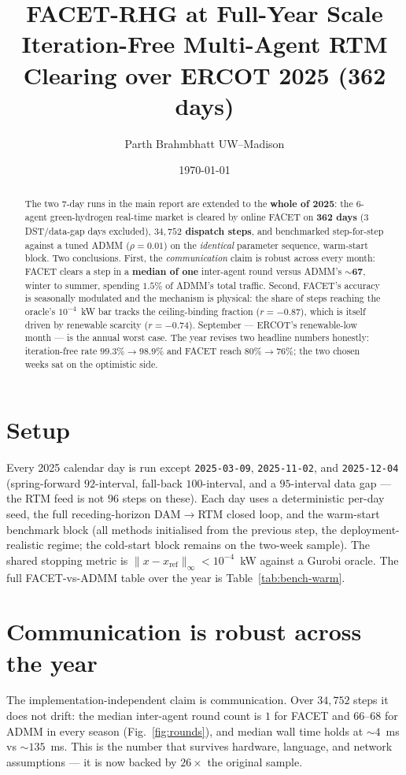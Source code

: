 \documentclass[11pt]{article}
\title{\textbf{FACET-RHG at Full-Year Scale}\\[2pt]
\large Iteration-Free Multi-Agent RTM Clearing over ERCOT 2025 (362 days)}
\author{Parth Brahmbhatt \quad\textbullet\quad UW--Madison}
\date{\today}
\begin{document}
\maketitle

\begin{abstract}
\noindent
The two 7-day runs in the main report are extended to the \textbf{whole of 2025}: the 6-agent
green-hydrogen real-time market is cleared by online FACET on \textbf{362 days} ($3$ DST/data-gap days
excluded), \textbf{$34{,}752$ dispatch steps}, and benchmarked step-for-step against a tuned ADMM
($\rho=0.01$) on the \emph{identical} parameter sequence, warm-start block. Two conclusions. First, the
\emph{communication} claim is robust across every month: FACET clears a step in a \textbf{median of one}
inter-agent round versus ADMM's \textbf{$\sim$67}, winter to summer, spending $1.5\%$ of ADMM's total
traffic. Second, FACET's accuracy is seasonally modulated and the mechanism is physical: the share of
steps reaching the oracle's $10^{-4}$~kW bar tracks the ceiling-binding fraction ($r=-0.87$), which is
itself driven by renewable scarcity ($r=-0.74$). September --- ERCOT's renewable-low month --- is the
annual worst case. The year revises two headline numbers honestly: iteration-free rate
$99.3\%\!\to\!98.9\%$ and FACET reach $80\%\!\to\!76\%$; the two chosen weeks sat on the optimistic side.
\end{abstract}

\section{Setup}
Every 2025 calendar day is run except \texttt{2025-03-09}, \texttt{2025-11-02}, and \texttt{2025-12-04}
(spring-forward $92$-interval, fall-back $100$-interval, and a $95$-interval data gap --- the RTM feed is
not $96$ steps on these). Each day uses a deterministic per-day seed, the full receding-horizon DAM$\to$RTM
closed loop, and the warm-start benchmark block (all methods initialised from the previous step, the
deployment-realistic regime; the cold-start block remains on the two-week sample). The shared stopping
metric is $\lVert x-x_{\mathrm{ref}}\rVert_\infty<10^{-4}$~kW against a Gurobi oracle. The full
FACET-vs-ADMM table over the year is Table~\ref{tab:bench-warm}.



\section{Communication is robust across the year}
The implementation-independent claim is communication. Over $34{,}752$ steps it does not drift: the median
inter-agent round count is $1$ for FACET and $66$--$68$ for ADMM in every season
(Fig.~\ref{fig:rounds}), and median wall time holds at $\sim\!4$~ms vs $\sim\!135$~ms. This is the number
that survives hardware, language, and network assumptions --- it is now backed by $26\times$ the original
sample.
\end{document}
